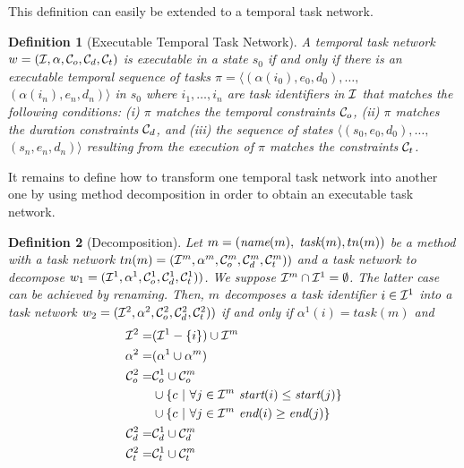 \documentclass[letterpaper]{article} %
\newtheorem{definition}{Definition}
\newcommand{\name}{\text{\it name}}
\newcommand{\tstart}{\text{\it start}}
\newcommand{\tend}{\text{\it end}}
\newcommand{\task}{\text{\it task}}
\begin{document}
 This definition can easily be extended to a temporal task network.
 
  \begin{definition}[Executable Temporal Task Network] A temporal task network $w = ({\cal{I}}, \alpha, {\cal{C}}_o, {\cal{C}}_d, {\cal{C}}_t)$ is executable in a state $s_0$ if and only if there is an executable temporal sequence of tasks $\pi = \langle (\alpha(i_0), e_0, d_0), \ldots,$ $(\alpha(i_n), e_n, d_n)\rangle$ in $s_0$ where $i_1, \ldots, i_n$ are task identifiers in $\cal{I}$ that matches the following conditions: (i) $\pi$ matches the temporal constraints ${\cal{C}}_o$, (ii) $\pi$ matches the duration constraints ${\cal{C}}_d$, and (iii) the sequence of states $\langle (s_0, e_0, d_0), \ldots,$ $(s_n, e_n, d_n) \rangle$ resulting from the execution of $\pi$ matches the constraints ${\cal{C}}_t$.
  \end{definition}
  
It remains to define how to transform one temporal task network into another one by using method decomposition in order to obtain an executable task network. 

\begin{definition}[Decomposition]
Let $m = (\name(m),$ $\task(m), tn(m))$ be a method with a task network $tn(m) = ({\cal{I}}^m, \alpha^m, {\cal{C}}_{o}^{m},{\cal{C}}_{d}^{m}, {\cal{C}}_{t}^{m}))$ and a task network to decompose $w_1= ({\cal{I}}^1, \alpha^1, {\cal{C}}_{o}^{1},{\cal{C}}_{d}^{1}, {\cal{C}}_{t}^{1}))$. We suppose ${\cal{I}}^m \cap {\cal{I}}^1 = \emptyset$. The latter case can be achieved by renaming. Then, $m$ decomposes a task identifier $i \in {\cal{I}}^1$ into a task network $w_2= ({\cal{I}}^2, \alpha^2, {\cal{C}}_{o}^{2},{\cal{C}}_{d}^{2}, {\cal{C}}_{t}^{2}))$ if and only if $\alpha^1(i) = task(m)$ and 
\begin{equation*} \label{eq1}
\begin{aligned}
{\cal{I}}^2 = & ({\cal{I}}^1 - \{i\}) \cup {\cal{I}}^m\\
\alpha^2 = & (\alpha^1 \cup \alpha^m)\\
{\cal{C}}^{2}_{o} = & {\cal{C}}^{1}_{o} \cup {\cal{C}}^{m}_{o} \\
        & \cup \{ c \ | \ \forall j \in {\cal{I}}^m \ \tstart(i) \leq \tstart(j) \}  \\
        & \cup \{ c \ | \ \forall j \in {\cal{I}}^m \ \tend(i) \geq \tend(j) \}  \\
{\cal{C}}^{2}_{d}  = & {\cal{C}}^{1}_{d} \cup {\cal{C}}^{m}_{d} \\
{\cal{C}}^{2}_{t}  = & {\cal{C}}^{1}_{t} \cup {\cal{C}}^{m}_{t} \\
\end{aligned}
\end{equation*}
\end{definition}
\end{document}
